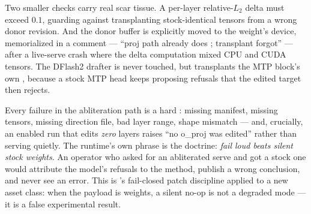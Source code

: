 Two smaller checks carry real
scar tissue. A per-layer relative-$L_2$ delta must exceed $0.1$, guarding
against transplanting stock-identical tensors from a wrong donor revision.
And the donor buffer is explicitly moved to the weight's device, memorialized
in a comment --- ``proj path already does ;
transplant forgot'' --- after a live-serve crash where the delta computation
mixed CPU and CUDA tensors. The DFlash2 drafter is never touched, but
 transplants the MTP block's own
, because a stock MTP head keeps proposing refusals that the
edited target then rejects.

\begin{hblesson}
Every failure in the abliteration path is a hard : missing
manifest, missing tensors, missing direction file, bad layer range, shape
mismatch --- and, crucially, an enabled run that edits \emph{zero} layers
raises ``no o\_proj was edited'' rather than serving quietly. The runtime's
own phrase is the doctrine: \emph{fail loud beats silent stock weights}.
An operator who asked for an abliterated serve and got a stock one would
attribute the model's refusals to the method, publish a wrong conclusion,
and never see an error. This is 's fail-closed patch
discipline applied to a new asset class: when the payload is weights, a
silent no-op is not a degraded mode --- it is a false experimental result.
\end{hblesson}

